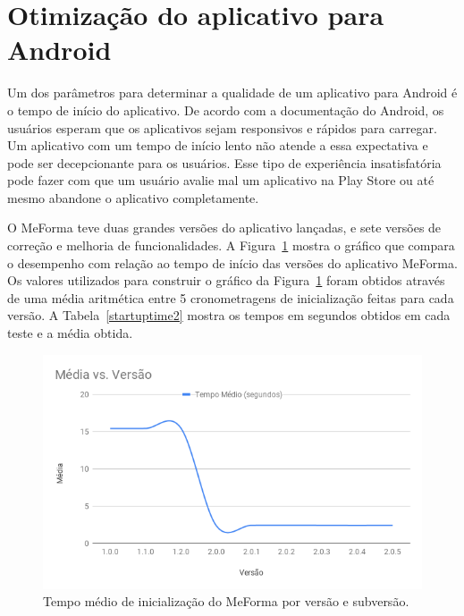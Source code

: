 \section{Otimização do aplicativo para Android}

Um dos parâmetros para determinar a qualidade de um aplicativo para Android é o tempo de início do aplicativo. De acordo com a documentação do Android, os usuários esperam que os aplicativos sejam responsivos e rápidos para carregar. Um aplicativo com um tempo de início lento não atende a essa expectativa e pode ser decepcionante para os usuários. Esse tipo de experiência insatisfatória pode fazer com que um usuário avalie mal um aplicativo na Play Store ou até mesmo abandone o aplicativo completamente.

O MeForma teve duas grandes versões do aplicativo lançadas, e sete versões de correção e melhoria de funcionalidades. A Figura~\ref{startuptime} mostra o gráfico que compara o desempenho com relação ao tempo de início das versões do aplicativo MeForma. Os valores utilizados para construir o gráfico da Figura~\ref{startuptime} foram obtidos através de uma média aritmética entre 5 cronometragens de inicialização feitas para cada versão. A Tabela~\ref{startuptime2} mostra os tempos em segundos obtidos em cada teste e a média obtida.

\begin{figure}[H]
	   \centering
	   		\includegraphics[scale=0.65]{pics/c5/9-startuptime.png}
	   \caption{Tempo médio de inicialização do MeForma por versão e subversão.}
	   \label{startuptime}
\end{figure}

